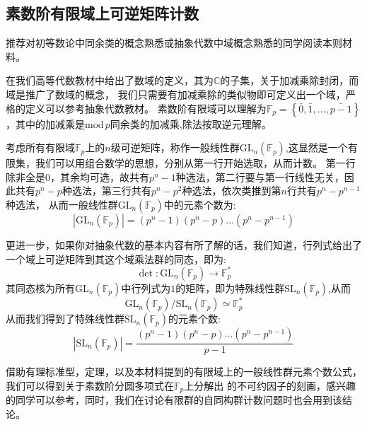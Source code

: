 \documentclass[a4paper,12pt]{ctexart}
\begin{document}
\subsection{素数阶有限域上可逆矩阵计数}
推荐对初等数论中同余类的概念熟悉或抽象代数中域概念熟悉的同学阅读本则材料。

在我们高等代数教材中给出了数域的定义，其为$\mathbb{C}$的子集，关于加减乘除封闭，而域是推广了数域的概念，
我们只需要有加减乘除的类似物即可定义出一个域，严格的定义可以参考抽象代数教材。
素数阶有限域可以理解为$\mathbb{F}_p=\left\{ \bar{0},\bar{1},\dots,\bar{p-1}\right\}$，其中的加减乘是$\text{mod}\,p$同余类的加减乘,除法按取逆元理解。

考虑所有有限域$\mathbb{F}_{p}$上的$n$级可逆矩阵，称作一般线性群$\text{GL}_n(\mathbb{F}_{p})$,这显然是一个有限集，我们可以用组合数学的思想，分别从第一行开始选取，从而计数。
第一行除非全是$0$，其余均可选，故共有$p^n-1$种选法，第二行要与第一行线性无关，因此共有$p^n-p$种选法，第三行共有$p^n-p^2$种选法，依次类推到第$n$行共有$p^n-p^{n-1}$种选法，
从而一般线性群$\text{GL}_n(\mathbb{F}_{p})$中的元素个数为:
\begin{equation*}
    |\text{GL}_n(\mathbb{F}_{p})|=(p^n-1)(p^n-p)\dots (p^n-p^{n-1})
\end{equation*}

更进一步，如果你对抽象代数的基本内容有所了解的话，我们知道，行列式给出了一个域上可逆矩阵到其这个域乘法群的同态，即为:
\begin{equation*}
    \det :\text{GL}_n(\mathbb{F}_{p})\rightarrow \mathbb{F}_{p}^{*}
\end{equation*}
其同态核为所有$\text{GL}_n(\mathbb{F}_{p})$中行列式为$1$的矩阵，即为特殊线性群$\text{SL}_n(\mathbb{F}_{p})$,从而\begin{equation*}
    \text{GL}_n(\mathbb{F}_{p})/\text{SL}_n(\mathbb{F}_{p})\simeq \mathbb{F}_{p}^{*}
\end{equation*}
从而我们得到了特殊线性群$\text{SL}_n(\mathbb{F}_{p})$的元素个数:
\begin{equation*}
    |\text{SL}_n(\mathbb{F}_{p})|=\dfrac{(p^n-1)(p^n-p)\dots (p^n-p^{n-1})}{p-1}
\end{equation*}

借助有理标准型，定理，以及本材料提到的有限域上的一般线性群元素个数公式，我们可以得到关于素数阶分圆多项式在$\mathbb{F}_p$上分解出
的不可约因子的刻画，感兴趣的同学可以参考\cite{dummit1991abstract}，同时，我们在讨论有限群的自同构群计数问题时也会用到该结论\cite{auto}。

\end{document}
